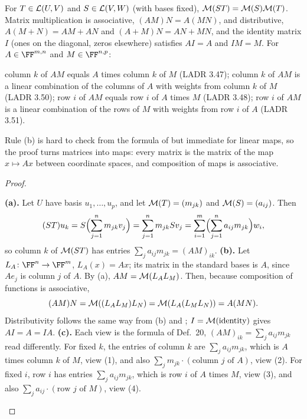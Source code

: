 \documentclass[10pt]{scrartcl}
\begin{document}
\begin{proposition*}
  \begin{enumerate}[(a)]
    \ii For $T\in\mathcal L(U,V)$ and $S\in\mathcal L(V,W)$ (with bases fixed), $\mathcal M(ST)=\mathcal M(S)\mathcal M(T)$.
    \ii Matrix multiplication is associative, $(AM)N=A(MN)$, and distributive, $A(M+N)=AM+AN$ and $(A+M)N=AN+MN$, and the identity matrix $I$ (ones on the diagonal, zeros elsewhere) satisfies $AI=A$ and $IM=M$.
    \ii For $A\in\FF^{m,n}$ and $M\in\FF^{n,p}$:
    \begin{enumerate}[(1)]
      \ii column $k$ of $AM$ equals $A$ times column $k$ of $M$ (LADR 3.47);
      \ii column $k$ of $AM$ is a linear combination of the columns of $A$ with weights from column $k$ of $M$ (LADR 3.50);
      \ii row $i$ of $AM$ equals row $i$ of $A$ times $M$ (LADR 3.48);
      \ii row $i$ of $AM$ is a linear combination of the rows of $M$ with weights from row $i$ of $A$ (LADR 3.51).
    \end{enumerate}
  \end{enumerate}
\end{proposition*}
\begin{ideabox}
  Rule (b) is hard to check from the formula of  but immediate for linear maps, so the proof turns matrices into maps: every matrix is the matrix of the map $x\mapsto Ax$ between coordinate spaces, and composition of maps is associative.
\end{ideabox}
\begin{proof}
  \begin{steps}
    \ii \textbf{(a).} Let $U$ have basis $u_1,\dots,u_p$, and let $\mathcal M(T)=(m_{jk})$ and $\mathcal M(S)=(a_{ij})$. Then
    \[
      (ST)u_k=S\Bigl(\sum_{j=1}^n m_{jk}v_j\Bigr)=\sum_{j=1}^n m_{jk}Sv_j=\sum_{i=1}^m\Bigl(\sum_{j=1}^n a_{ij}m_{jk}\Bigr)w_i,
    \]
    so column $k$ of $\mathcal M(ST)$ has entries $\sum_ja_{ij}m_{jk}=(AM)_{ik}$.
    \ii \textbf{(b).} Let $L_A\colon\FF^{n}\to\FF^m$, $L_A(x)=Ax$; its matrix in the standard bases is $A$, since $Ae_j$ is column $j$ of $A$. By (a), $AM=\mathcal M(L_AL_M)$. Then, because composition of functions is associative,
    \[
      (AM)N=\mathcal M((L_AL_M)L_N)=\mathcal M(L_A(L_ML_N))=A(MN).
    \] Distributivity follows the same way from (b) and ; $I=\mathcal M(\text{identity})$ gives $AI=A=IA$.
    \ii \textbf{(c).} Each view is the formula of Def.~20, $(AM)_{ik}=\sum_ja_{ij}m_{jk}$ read differently. For fixed $k$, the entries of column $k$ are $\sum_ja_{ij}m_{jk}$, which is $A$ times column $k$ of $M$, view (1), and also $\sum_jm_{jk}\cdot(\text{column }j\text{ of }A)$, view (2). For fixed $i$, row $i$ has entries $\sum_ja_{ij}m_{jk}$, which is row $i$ of $A$ times $M$, view (3), and also $\sum_ja_{ij}\cdot(\text{row }j\text{ of }M)$, view (4).
  \end{steps}
\end{proof}
\end{document}
